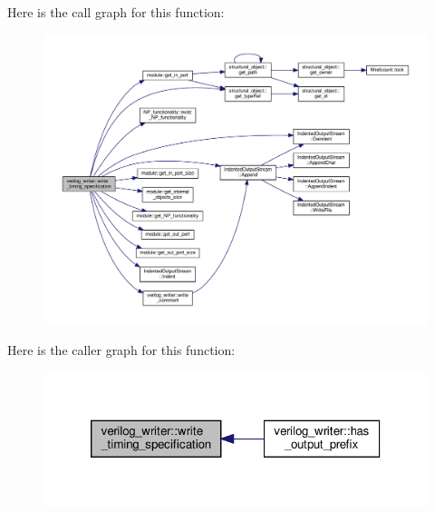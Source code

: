 Here is the call graph for this function\+:
\nopagebreak
\begin{figure}[H]
\begin{center}
\leavevmode
\includegraphics[width=350pt]{d8/dba/classverilog__writer_a19adf1be19b905787d523ecbf8e654aa_cgraph}
\end{center}
\end{figure}
Here is the caller graph for this function\+:
\nopagebreak
\begin{figure}[H]
\begin{center}
\leavevmode
\includegraphics[width=320pt]{d8/dba/classverilog__writer_a19adf1be19b905787d523ecbf8e654aa_icgraph}
\end{center}
\end{figure}
\mbox{\label{classverilog__writer_a2c853b73efc5ca8215061d1055168718}} 

